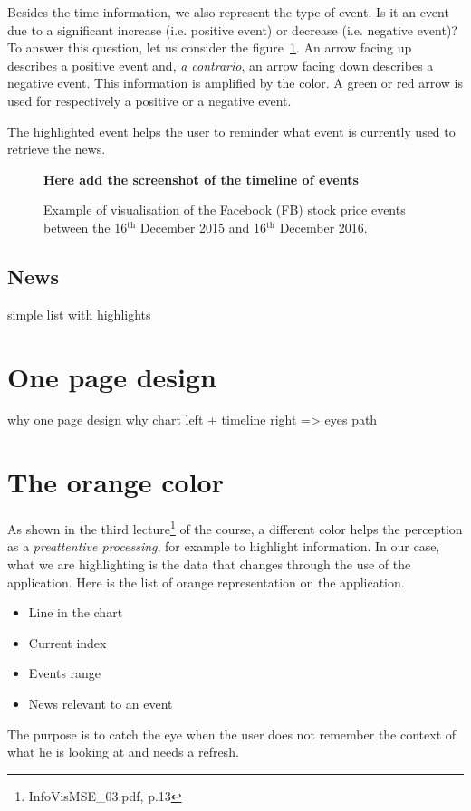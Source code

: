 Besides the time information, we also represent the type of event. Is it an event due to a significant increase (i.e. positive event) or decrease (i.e. negative event)? To answer this question, let us consider the figure~\ref{fig:event-timeline}. An arrow facing up describes a positive event and, \textit{a contrario}, an arrow facing down describes a negative event. This information is amplified by the color. A green or red arrow is used for respectively a positive or a negative event.

The highlighted event helps the user to reminder what event is currently used to retrieve the news.


\begin{figure}
    \centering
    \textbf{Here add the screenshot of the timeline of events}
    \caption{Example of visualisation of the Facebook (FB) stock price events between the 16$^{\text{th}}$ December 2015 and 16$^{\text{th}}$ December 2016.}
    \label{fig:event-timeline}
\end{figure}

\subsection{News}
simple list with highlights

\section{One page design}
why one page design
why chart left + timeline right => eyes path

\section{The orange color}
As shown in the third lecture\footnote{InfoVisMSE\_03.pdf, p.13} of the course, a different color helps the perception as a \textit{preattentive processing}, for example to highlight information. In our case, what we are highlighting is the data that changes through the use of the application. Here is the list of orange representation on the application.
\begin{itemize}
    \item Line in the chart
    \item Current index
    \item Events range
    \item News relevant to an event
\end{itemize}
The purpose is to catch the eye when the user does not remember the context of what he is looking at and needs a refresh.

